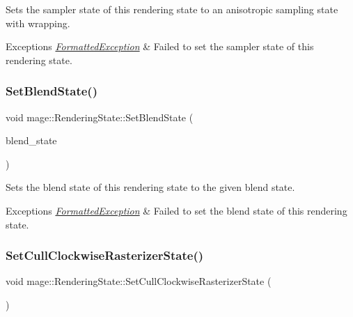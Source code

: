 Sets the sampler state of this rendering state to an anisotropic sampling state with wrapping.


\begin{DoxyExceptions}{Exceptions}
{\em \hyperlink{structmage_1_1_formatted_exception}{Formatted\+Exception}} & Failed to set the sampler state of this rendering state. \\
\hline
\end{DoxyExceptions}
\hypertarget{structmage_1_1_rendering_state_aa91119e7704856c097adb20b6080a26e}{}\label{structmage_1_1_rendering_state_aa91119e7704856c097adb20b6080a26e} 
\subsubsection{\texorpdfstring{Set\+Blend\+State()}{SetBlendState()}}
{\footnotesize\ttfamily void mage\+::\+Rendering\+State\+::\+Set\+Blend\+State (\begin{DoxyParamCaption}\item[{I\+D3\+D11\+Blend\+State $\ast$}]{blend\+\_\+state }\end{DoxyParamCaption})\hspace{0.3cm}{\ttfamily [noexcept]}}

Sets the blend state of this rendering state to the given blend state.


\begin{DoxyExceptions}{Exceptions}
{\em \hyperlink{structmage_1_1_formatted_exception}{Formatted\+Exception}} & Failed to set the blend state of this rendering state. \\
\hline
\end{DoxyExceptions}
\hypertarget{structmage_1_1_rendering_state_a707034239265916d82e7dbe168f09cb6}{}\label{structmage_1_1_rendering_state_a707034239265916d82e7dbe168f09cb6} 
\subsubsection{\texorpdfstring{Set\+Cull\+Clockwise\+Rasterizer\+State()}{SetCullClockwiseRasterizerState()}}
{\footnotesize\ttfamily void mage\+::\+Rendering\+State\+::\+Set\+Cull\+Clockwise\+Rasterizer\+State (\begin{DoxyParamCaption}{ }\end{DoxyParamCaption})}

